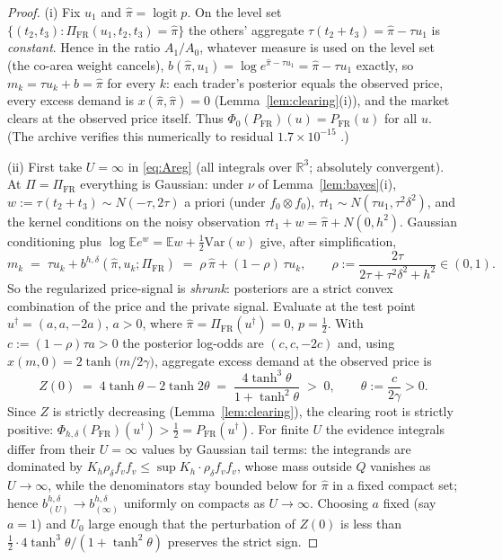 \documentclass[11pt]{article}
\theoremstyle{definition}
\newcommand{\R}{\mathbb{R}}
\newcommand{\E}{\mathbb{E}}
\begin{document}
\begin{proof}
(i) Fix $u_1$ and $\hat\pi=\operatorname{logit}p$. On the level set
$\{(t_2,t_3):\Pi_{\mathrm{FR}}(u_1,t_2,t_3)=\hat\pi\}$ the others' aggregate
$\tau(t_2+t_3)=\hat\pi-\tau u_1$ is \emph{constant}. Hence in the ratio
$A_1/A_0$, whatever measure is used on the level set (the co-area weight
cancels), $b(\hat\pi,u_1)=\log e^{\hat\pi-\tau u_1}=\hat\pi-\tau u_1$
exactly, so $m_k=\tau u_k+b=\hat\pi$ for every $k$: each trader's posterior
equals the observed price, every excess demand is $x(\hat\pi,\hat\pi)=0$
(Lemma~\ref{lem:clearing}(i)), and the market clears at the observed price
itself. Thus $\Phi_0(P_{\mathrm{FR}})(u)=P_{\mathrm{FR}}(u)$ for all $u$.
(The archive verifies this numerically to residual
$1.7\times10^{-15}$ \cite{REZN}.)

(ii) First take $U=\infty$ in \eqref{eq:Areg} (all integrals over $\R^3$;
absolutely convergent). At $\Pi=\Pi_{\mathrm{FR}}$ everything is Gaussian:
under $\nu$ of Lemma~\ref{lem:bayes}(i), $w:=\tau(t_2+t_3)\sim N(-\tau,2\tau)$
a priori (under $f_0\otimes f_0$), $\tau t_1\sim N(\tau u_1,\tau^2\delta^2)$,
and the kernel conditions on the noisy observation
$\tau t_1+w=\hat\pi+N(0,h^2)$. Gaussian conditioning plus
$\log\E e^{w}=\E w+\tfrac12\mathrm{Var}(w)$ give, after simplification,
\begin{equation}\label{eq:rho}
m_k\;=\;\tau u_k+b^{h,\delta}(\hat\pi,u_k;\Pi_{\mathrm{FR}})
\;=\;\rho\,\hat\pi+(1-\rho)\,\tau u_k,
\qquad
\rho:=\frac{2\tau}{2\tau+\tau^2\delta^2+h^2}\in(0,1).
\end{equation}
So the regularized price-signal is \emph{shrunk}: posteriors are a strict
convex combination of the price and the private signal. Evaluate at the
test point $u^\dagger=(a,a,-2a)$, $a>0$, where
$\hat\pi=\Pi_{\mathrm{FR}}(u^\dagger)=0$, $p=\tfrac12$. With
$c:=(1-\rho)\tau a>0$ the posterior log-odds are $(c,c,-2c)$ and, using
$x(m,0)=2\tanh\!\big(m/2\gamma\big)$, aggregate excess demand at the
observed price is
\[
Z(0)\;=\;4\tanh\theta-2\tanh 2\theta
\;=\;\frac{4\tanh^3\theta}{1+\tanh^2\theta}\;>\;0,
\qquad \theta:=\frac{c}{2\gamma}>0 .
\]
Since $Z$ is strictly decreasing (Lemma~\ref{lem:clearing}), the clearing
root is strictly positive:
$\Phi_{h,\delta}(P_{\mathrm{FR}})(u^\dagger)>\tfrac12
=P_{\mathrm{FR}}(u^\dagger)$. For finite $U$ the evidence integrals differ
from their $U=\infty$ values by Gaussian tail terms: the integrands are
dominated by $K_h\rho_\delta f_vf_v\le \sup K_h\cdot\rho_\delta f_vf_v$,
whose mass outside $Q$ vanishes as $U\to\infty$, while the denominators stay
bounded below for $\hat\pi$ in a fixed compact set; hence
$b^{h,\delta}_{(U)}\to b^{h,\delta}_{(\infty)}$ uniformly on compacts as
$U\to\infty$. Choosing $a$ fixed (say $a=1$) and $U_0$ large enough that the
perturbation of $Z(0)$ is less than
$\tfrac12\cdot 4\tanh^3\theta/(1+\tanh^2\theta)$ preserves the strict sign.
\end{proof}
\end{document}
